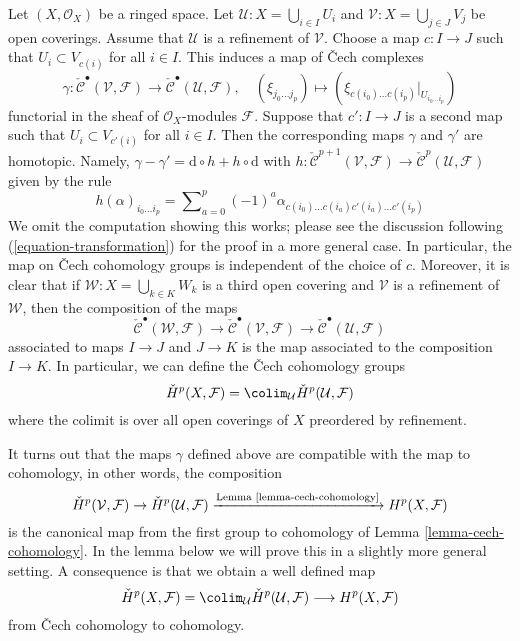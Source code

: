 \noindent
Let $(X, \mathcal{O}_X)$ be a ringed space. Let
$\mathcal{U} : X = \bigcup_{i \in I} U_i$ and
$\mathcal{V} : X = \bigcup_{j \in J} V_j$ be open coverings.
Assume that $\mathcal{U}$ is a refinement of $\mathcal{V}$.
Choose a map $c : I \to J$ such that $U_i \subset V_{c(i)}$
for all $i \in I$. This induces a map of {\v C}ech complexes
$$
\gamma :
\check{\mathcal{C}}^\bullet(\mathcal{V}, \mathcal{F})
\longrightarrow
\check{\mathcal{C}}^\bullet(\mathcal{U}, \mathcal{F}),
\quad
(\xi_{j_0 \ldots j_p})
\longmapsto
(\xi_{c(i_0) \ldots c(i_p)}|_{U_{i_0 \ldots i_p}})
$$
functorial in the sheaf of $\mathcal{O}_X$-modules $\mathcal{F}$.
Suppose that $c' : I \to J$ is a second map such that
$U_i \subset V_{c'(i)}$ for all $i \in I$. Then the corresponding maps
$\gamma$ and $\gamma'$ are homotopic. Namely,
$\gamma - \gamma' = \text{d} \circ h + h \circ \text{d}$
with
$h : \check{\mathcal{C}}^{p + 1}(\mathcal{V}, \mathcal{F}) \to
\check{\mathcal{C}}^p(\mathcal{U}, \mathcal{F})$
given by the rule
$$
h(\alpha)_{i_0 \ldots i_p} =
\sum\nolimits_{a = 0}^{p}
(-1)^a
\alpha_{c(i_0)\ldots c(i_a) c'(i_a) \ldots c'(i_p)}
$$
We omit the computation showing this works; please see the discussion
following (\ref{equation-transformation}) for the proof in a more general
case. In particular, the map on {\v C}ech cohomology groups is independent
of the choice of $c$. Moreover, it is clear that if
$\mathcal{W} : X = \bigcup_{k \in K} W_k$ is a third open covering
and $\mathcal{V}$ is a refinement of $\mathcal{W}$, then the composition
of the maps
$$
\check{\mathcal{C}}^\bullet(\mathcal{W}, \mathcal{F})
\longrightarrow
\check{\mathcal{C}}^\bullet(\mathcal{V}, \mathcal{F})
\longrightarrow
\check{\mathcal{C}}^\bullet(\mathcal{U}, \mathcal{F})
$$
associated to maps $I \to J$ and $J \to K$ is the map associated
to the composition $I \to K$.
In particular, we can define the {\v C}ech cohomology
groups
$$
\check{H}^p(X, \mathcal{F}) =
\colim_\mathcal{U} \check{H}^p(\mathcal{U}, \mathcal{F})
$$
where the colimit is over all open coverings of $X$ preordered by refinement.

\medskip\noindent
It turns out that the maps $\gamma$ defined above are compatible with
the map to cohomology, in other words, the composition
$$
\check{H}^p(\mathcal{V}, \mathcal{F}) \to
\check{H}^p(\mathcal{U}, \mathcal{F})
\xrightarrow{\text{Lemma \ref{lemma-cech-cohomology}}}
H^p(X, \mathcal{F})
$$
is the canonical map from the first group to cohomology of
Lemma \ref{lemma-cech-cohomology}. 
In the lemma below we will prove this in a slightly more general
setting. A consequence is that we obtain a well defined map
\begin{equation}
\label{equation-cech-to-cohomology}
\check{H}^p(X, \mathcal{F}) =
\colim_\mathcal{U} \check{H}^p(\mathcal{U}, \mathcal{F})
\longrightarrow
H^p(X, \mathcal{F})
\end{equation}
from {\v C}ech cohomology to cohomology.

